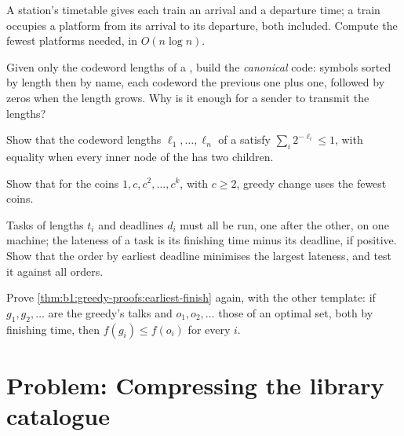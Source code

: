 \begin{exercise}[$\star\star$]\label{exo:b1:greedy-proofs:7}
A station's timetable gives each train an arrival and a departure time; a train occupies a platform from its arrival to
its departure, both included. Compute the fewest platforms needed, in $O(n \log n)$.
\end{exercise}

\begin{exercise}[$\star\star$]\label{exo:b1:greedy-proofs:8}
Given only the codeword lengths of a , build the \emph{canonical} code: symbols sorted by length then by
name, each codeword the previous one plus one, followed by zeros when the length grows. Why is it enough for a sender to
transmit the lengths?
\end{exercise}

\begin{exercise}[$\star\star$]\label{exo:b1:greedy-proofs:9}
Show that the codeword lengths $\ell_1, \dots, \ell_n$ of a  satisfy $\sum_i 2^{-\ell_i} \leq 1$, with equality
when every inner node of the  has two children.
\end{exercise}

\begin{exercise}[$\star\star\star$]\label{exo:b1:greedy-proofs:10}
Show that for the coins $1, c, c^2, \dots, c^k$, with $c \geq 2$, greedy change uses the fewest coins.
\end{exercise}

\begin{exercise}[$\star\star\star$]\label{exo:b1:greedy-proofs:11}
Tasks of lengths $t_i$ and deadlines $d_i$ must all be run, one after the other, on one machine; the lateness of a task
is its finishing time minus its deadline, if positive. Show that the order by earliest deadline minimises the largest
lateness, and test it against all orders.
\end{exercise}

\begin{exercise}[$\star\star\star$]\label{exo:b1:greedy-proofs:12}
Prove \cref{thm:b1:greedy-proofs:earliest-finish} again, with the other template: if $g_1, g_2, \dots$ are the greedy's
talks and $o_1, o_2, \dots$ those of an optimal set, both by finishing time, then $f(g_i) \leq f(o_i)$ for every $i$.
\end{exercise}

\section{Problem: Compressing the library catalogue}\label{sec:b1:greedy-proofs:problem}

